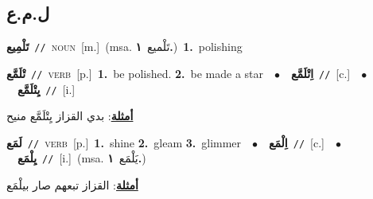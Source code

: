 \documentclass[10pt,a4paper,twoside]{article} %
\begin{document}
\begin{multicols}{2}
\vspace{-3mm}
\subsection*{\color{blue}\foreignlanguage{arabic}{ل.م.ع}\color{blue}{}} 

{\setlength\topsep{0pt}\textbf{\foreignlanguage{arabic}{تَلْمِيع}}\ {\color{gray}\texttt{//}\color{black}}\ \textsc{noun}\ [m.]\ \color{gray}(msa. \foreignlanguage{arabic}{تَلْميع}~\foreignlanguage{arabic}{\textbf{١.}})\color{black}\ \textbf{1.}~polishing\ } \vspace{2mm}

{\setlength\topsep{0pt}\textbf{\foreignlanguage{arabic}{تْلَمَّع}}\ {\color{gray}\texttt{//}\color{black}}\ \textsc{verb}\ [p.]\ \textbf{1.}~be polished.  \textbf{2.}~be made a star\ \ $\bullet$\ \ \setlength\topsep{0pt}\textbf{\foreignlanguage{arabic}{اِتْلَمَّع}}\ {\color{gray}\texttt{//}\color{black}}\ [c.]\ \ $\bullet$\ \ \setlength\topsep{0pt}\textbf{\foreignlanguage{arabic}{يِتْلَمَّع}}\ {\color{gray}\texttt{//}\color{black}}\ [i.]\  \begin{flushright}\color{gray}\foreignlanguage{arabic}{\textbf{\underline{\foreignlanguage{arabic}{أمثلة}}}: بدي القزاز يِتْلَمَّع منيح}\end{flushright}\color{black}} \vspace{2mm}

{\setlength\topsep{0pt}\textbf{\foreignlanguage{arabic}{لَمَع}}\ {\color{gray}\texttt{//}\color{black}}\ \textsc{verb}\ [p.]\ \textbf{1.}~shine  \textbf{2.}~gleam  \textbf{3.}~glimmer\ \ $\bullet$\ \ \setlength\topsep{0pt}\textbf{\foreignlanguage{arabic}{اِلْمَع}}\ {\color{gray}\texttt{//}\color{black}}\ [c.]\ \ $\bullet$\ \ \setlength\topsep{0pt}\textbf{\foreignlanguage{arabic}{يِلْمَع}}\ {\color{gray}\texttt{//}\color{black}}\ [i.]\ \color{gray}(msa. \foreignlanguage{arabic}{يَلْمَع}~\foreignlanguage{arabic}{\textbf{١.}})\color{black}\  \begin{flushright}\color{gray}\foreignlanguage{arabic}{\textbf{\underline{\foreignlanguage{arabic}{أمثلة}}}: القزاز تبعهم صار بيلْمَع}\end{flushright}\color{black}} \vspace{2mm}


\end{multicols}
\end{document}
